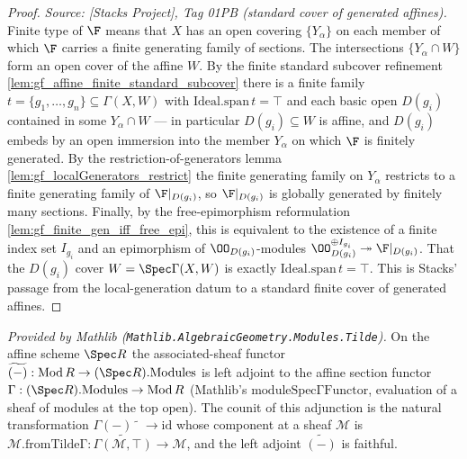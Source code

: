 \begin{proof}
        \leanok
  \textit{Source: [Stacks Project], Tag 01PB (standard cover of generated affines).}
  Finite type of \(\F\) means that \(X\) has an open covering \(\{Y_\alpha\}\) on each
  member of which \(\F\) carries a finite generating family of sections. The intersections
  \(\{Y_\alpha \cap W\}\) form an open cover of the affine \(W\). By the finite standard
  subcover refinement \cref{lem:gf_affine_finite_standard_subcover} there is a finite family
  \(t = \{g_1, \dots, g_n\} \subseteq \Gamma(X, W)\) with
  \(\mathrm{Ideal.span}\,t = \top\) and each basic open \(D(g_i)\) contained in some
  \(Y_\alpha \cap W\) — in particular \(D(g_i) \subseteq W\) is affine, and \(D(g_i)\)
  embeds by an open immersion into the member \(Y_\alpha\) on which \(\F\) is finitely
  generated. By the restriction-of-generators lemma
  \cref{lem:gf_localGenerators_restrict} the finite generating family on \(Y_\alpha\)
  restricts to a finite generating family of \(\F|_{D(g_i)}\), so \(\F|_{D(g_i)}\) is
  globally generated by finitely many sections. Finally, by the free-epimorphism
  reformulation \cref{lem:gf_finite_gen_iff_free_epi}, this is equivalent to the existence
  of a finite index set \(I_{g_i}\) and an epimorphism of \(\OO_{D(g_i)}\)-modules
  \(\OO_{D(g_i)}^{\oplus I_{g_i}} \twoheadrightarrow \F|_{D(g_i)}\). That the \(D(g_i)\)
  cover \(W = \Spec \Gamma(X, W)\) is exactly \(\mathrm{Ideal.span}\,t = \top\). This is
  Stacks' passage from the local-generation datum to a standard finite cover of generated
  affines.
\end{proof}

\begin{lemma}
  \label{lem:tilde_adjunction_mathlib}
  \mathlibok
  \textit{Provided by Mathlib (\texttt{Mathlib.AlgebraicGeometry.Modules.Tilde}).}
  On the affine scheme \(\Spec R\) the associated-sheaf functor
  \(\widetilde{(-)} : \mathrm{Mod}\,R \to (\Spec R).\mathrm{Modules}\) is left adjoint to the
  affine section functor \(\Gamma : (\Spec R).\mathrm{Modules} \to \mathrm{Mod}\,R\) (Mathlib's
  \(\mathrm{moduleSpecΓFunctor}\), evaluation of a sheaf of modules at the top open). The counit of
  this adjunction is the natural transformation
  \(\Gamma(-)\,\widetilde{\phantom{x}} \to \mathrm{id}\) whose component at a sheaf \(\mathcal{M}\)
  is \(\mathcal{M}.\mathrm{fromTildeΓ} : \widetilde{\Gamma(\mathcal{M}, \top)} \to \mathcal{M}\), and
  the left adjoint \(\widetilde{(-)}\) is faithful.
\end{lemma}

